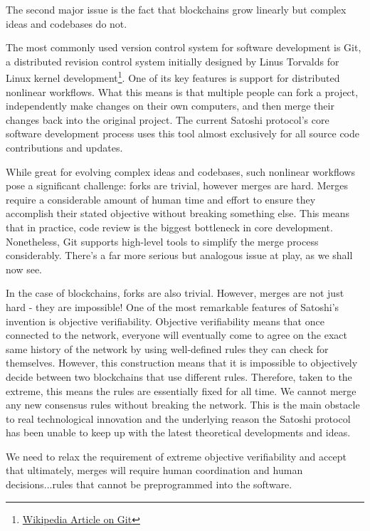 \documentclass{article}
\begin{document}
The second major issue is the fact that blockchains grow linearly but complex ideas and codebases do not.

The most commonly used version control system for software development is Git, a distributed revision control system initially designed by Linus Torvalds for Linux kernel development\footnote{\href{http://en.wikipedia.org/wiki/Git\_(software)}{Wikipedia Article on Git}}. One of its key features is support for distributed nonlinear workflows. What this means is that multiple people can fork a project, independently make changes on their own computers, and then merge their changes back into the original project. The current Satoshi protocol's core software development process uses this tool almost exclusively for all source code contributions and updates.

While great for evolving complex ideas and codebases, such nonlinear workflows pose a significant challenge: forks are trivial, however merges are hard. Merges require a considerable amount of human time and effort to ensure they accomplish their stated objective without breaking something else. This means that in practice, code review is the biggest bottleneck in core development. Nonetheless, Git supports high-level tools to simplify the merge process considerably. There's a far more serious but analogous issue at play, as we shall now see.

In the case of blockchains, forks are also trivial. However, merges are not just hard - they are impossible! One of the most remarkable features of Satoshi's invention is objective verifiability. Objective verifiability means that once connected to the network, everyone will eventually come to agree on the exact same history of the network by using well-defined rules they can check for themselves. However, this construction means that it is impossible to objectively decide between two blockchains that use different rules. Therefore, taken to the extreme, this means the rules are essentially fixed for all time. We cannot merge any new consensus rules without breaking the network. This is the main obstacle to real technological innovation and the underlying reason the Satoshi protocol has been unable to keep up with the latest theoretical developments and ideas.

We need to relax the requirement of extreme objective verifiability and accept that ultimately, merges will require human coordination and human decisions...rules that cannot be preprogrammed into the software.
\end{document}

